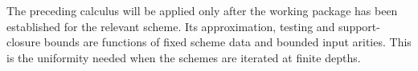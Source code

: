 The preceding calculus will be applied only after the working package
has been established for the relevant scheme.  Its approximation,
testing and support-closure bounds are functions of fixed scheme data
and bounded input arities.  This is the uniformity needed when the
schemes are iterated at finite depths.
